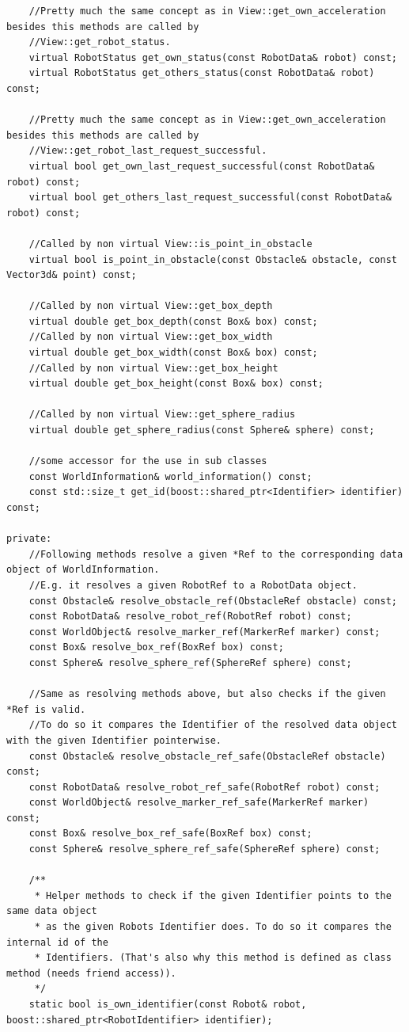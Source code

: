 \begin{appendix}
\begin{lstlisting}
	//Pretty much the same concept as in View::get_own_acceleration besides this methods are called by
	//View::get_robot_status.
	virtual RobotStatus get_own_status(const RobotData& robot) const;
	virtual RobotStatus get_others_status(const RobotData& robot) const;
	
	//Pretty much the same concept as in View::get_own_acceleration besides this methods are called by
	//View::get_robot_last_request_successful.
	virtual bool get_own_last_request_successful(const RobotData& robot) const;
	virtual bool get_others_last_request_successful(const RobotData& robot) const;

	//Called by non virtual View::is_point_in_obstacle
	virtual bool is_point_in_obstacle(const Obstacle& obstacle, const Vector3d& point) const;

	//Called by non virtual View::get_box_depth
	virtual double get_box_depth(const Box& box) const;
	//Called by non virtual View::get_box_width
	virtual double get_box_width(const Box& box) const;
	//Called by non virtual View::get_box_height
	virtual double get_box_height(const Box& box) const;

	//Called by non virtual View::get_sphere_radius
	virtual double get_sphere_radius(const Sphere& sphere) const;

	//some accessor for the use in sub classes
	const WorldInformation& world_information() const;
	const std::size_t get_id(boost::shared_ptr<Identifier> identifier) const;

private:
	//Following methods resolve a given *Ref to the corresponding data object of WorldInformation.
	//E.g. it resolves a given RobotRef to a RobotData object.
	const Obstacle& resolve_obstacle_ref(ObstacleRef obstacle) const;
	const RobotData& resolve_robot_ref(RobotRef robot) const;
	const WorldObject& resolve_marker_ref(MarkerRef marker) const;
	const Box& resolve_box_ref(BoxRef box) const;
	const Sphere& resolve_sphere_ref(SphereRef sphere) const;

	//Same as resolving methods above, but also checks if the given *Ref is valid.
	//To do so it compares the Identifier of the resolved data object with the given Identifier pointerwise.
	const Obstacle& resolve_obstacle_ref_safe(ObstacleRef obstacle) const;
	const RobotData& resolve_robot_ref_safe(RobotRef robot) const;
	const WorldObject& resolve_marker_ref_safe(MarkerRef marker) const;
	const Box& resolve_box_ref_safe(BoxRef box) const;
	const Sphere& resolve_sphere_ref_safe(SphereRef sphere) const;

	/**
	 * Helper methods to check if the given Identifier points to the same data object
	 * as the given Robots Identifier does. To do so it compares the internal id of the
	 * Identifiers. (That's also why this method is defined as class method (needs friend access)).
	 */
	static bool is_own_identifier(const Robot& robot, boost::shared_ptr<RobotIdentifier> identifier);


\end{lstlisting}
\end{appendix}
